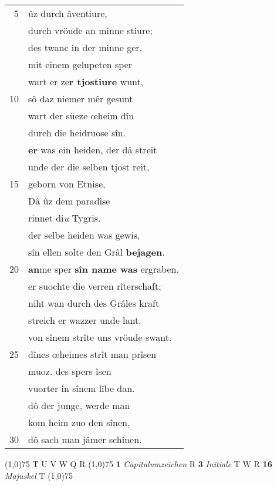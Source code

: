 \documentclass[8pt,a4paper,notitlepage]{article}
\begin{document}
\begin{table}[ht]
\begin{minipage}[t]{0.5\linewidth}
\begin{tabular}{rl}
5 & ûz durch âventiure,\\ 
 & durch vröude an minne stiure;\\ 
 & des twanc in der minne ger.\\ 
 & mit einem gelupeten sper\\ 
 & wart er ze\textbf{r tjostiure} wunt,\\ 
10 & sô daz niemer mêr gesunt\\ 
 & wart der süeze œheim dîn\\ 
 & durch die heidruose sîn.\\ 
 & \textbf{er} was ein heiden, der dâ streit\\ 
 & unde der die selben tjost reit,\\ 
15 & geborn von Etnise,\\ 
 & Dâ ûz dem paradîse\\ 
 & rinnet di\textit{u} Tygris.\\ 
 & der selbe heiden was gewis,\\ 
 & sîn ellen solte den Grâl \textbf{bejagen}.\\ 
20 & \textbf{an}me sper \textbf{sîn name was} ergraben.\\ 
 & er suochte die verren rîterschaft;\\ 
 & niht wan durch des Grâles kraft\\ 
 & streich er wazzer unde lant.\\ 
 & von sînem strîte uns vröude swant.\\ 
25 & dînes œheimes strît man prîsen\\ 
 & muoz. des spers îsen\\ 
 & vuorter in sînem lîbe dan.\\ 
 & dô der junge, werde man\\ 
 & kom heim zuo den sînen,\\ 
30 & dô sach man jâmer schînen.\\ 
\end{tabular}
\scriptsize
\line(1,0){75} \newline
T U V W Q R \newline
\line(1,0){75} \newline
\textbf{1} \textit{Capitulumzeichen} R  \textbf{3} \textit{Initiale} T W R  \textbf{16} \textit{Majuskel} T  \newline
\line(1,0){75} \newline

\end{minipage}
\end{table}
\end{document}
